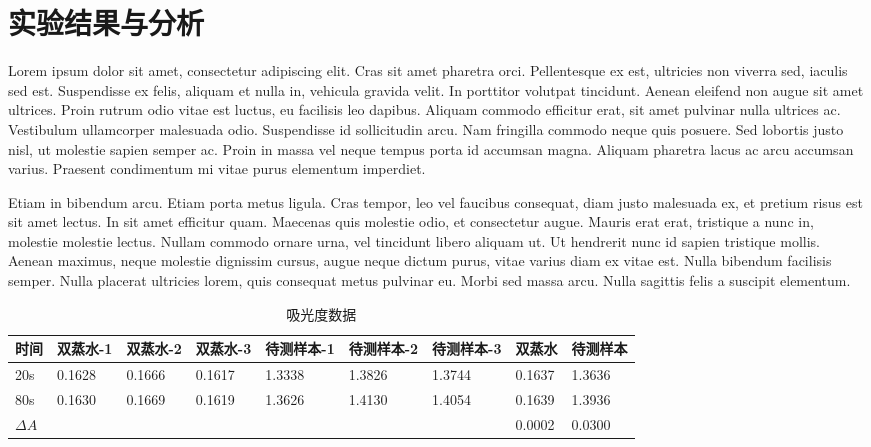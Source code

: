 \documentclass{xjtureport}
\begin{document}
\section{实验结果与分析}

Lorem ipsum dolor sit amet, consectetur adipiscing elit. Cras sit amet pharetra orci. Pellentesque ex est, ultricies non viverra sed, iaculis sed est. Suspendisse ex felis, aliquam et nulla in, vehicula gravida velit. In porttitor volutpat tincidunt. Aenean eleifend non augue sit amet ultrices. Proin rutrum odio vitae est luctus, eu facilisis leo dapibus. Aliquam commodo efficitur erat, sit amet pulvinar nulla ultrices ac. Vestibulum ullamcorper malesuada odio. Suspendisse id sollicitudin arcu. Nam fringilla commodo neque quis posuere. Sed lobortis justo nisl, ut molestie sapien semper ac. Proin in massa vel neque tempus porta id accumsan magna. Aliquam pharetra lacus ac arcu accumsan varius. Praesent condimentum mi vitae purus elementum imperdiet.

Etiam in bibendum arcu. Etiam porta metus ligula. Cras tempor, leo vel faucibus consequat, diam justo malesuada ex, et pretium risus est sit amet lectus. In sit amet efficitur quam. Maecenas quis molestie odio, et consectetur augue. Mauris erat erat, tristique a nunc in, molestie molestie lectus. Nullam commodo ornare urna, vel tincidunt libero aliquam ut. Ut hendrerit nunc id sapien tristique mollis. Aenean maximus, neque molestie dignissim cursus, augue neque dictum purus, vitae varius diam ex vitae est. Nulla bibendum facilisis semper. Nulla placerat ultricies lorem, quis consequat metus pulvinar eu. Morbi sed massa arcu. Nulla sagittis felis a suscipit elementum.

\begin{table}[!htbp]
    \begin{center}
        \begin{tabular}{lllllllll}
            \toprule
            时间 & 双蒸水-1 & 双蒸水-2 & 双蒸水-3 & 待测样本-1 & 待测样本-2 & 待测样本-3 & 双蒸水 & 待测样本  \\
            \midrule
            20s  & 0.1628 & 0.1666 & 0.1617 & 1.3338 & 1.3826 & 1.3744 & 0.1637 & 1.3636  \\
            80s  & 0.1630 & 0.1669 & 0.1619 & 1.3626 & 1.4130 & 1.4054 & 0.1639 & 1.3936 \\
            $\Delta A$  &  &  &  &  &  &  & 0.0002 & 0.0300 \\
            \bottomrule
        \end{tabular}
    \end{center}
    \caption{吸光度数据}
    \label{fig:dist}
\end{table}
\end{document}
